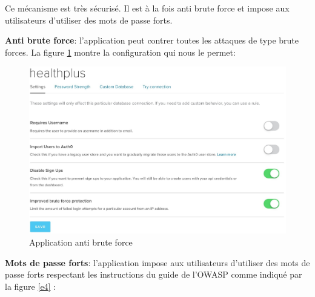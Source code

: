 Ce mécanisme est très sécurisé. Il est à la fois anti brute force et impose aux utilisateurs d'utiliser des mots de passe forts.

\vspace{6pt}
\paragraphmark

\textbf{Anti brute force}: l'application peut contrer toutes les attaques de type brute forces. La figure \ref{e3} montre la configuration qui nous le permet:

\begin{figure}[!ht]
\begin{center}
\includegraphics[scale=0.28]{e3.jpg}
\caption{Application anti brute force}
\label{e3}
\end{center}
\end{figure}

\textbf{Mots de passe forts}: l'application impose aux utilisateurs d’utiliser des mots de passe forts respectant les instructions du guide de l’OWASP comme indiqué par la figure \ref{e4} :


